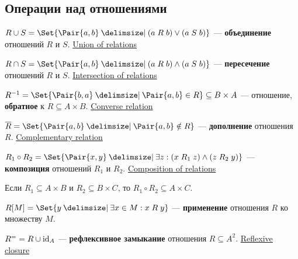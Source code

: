 \documentclass[a4paper,10pt]{article}
\begin{document}
\subsection{Операции над отношениями}

\begin{terms}
    \item $R \union S = \Set{\Pair{a,b} \given (a \rel[R] b) \lor (a \rel[S] b)}$ --- \textbf{объединение} отношений $R$ и $S$.
    \hfill\href{https://en.wikipedia.org/wiki/Binary_relation#Union}{Union of relations}

    \item $R \intersection S = \Set{\Pair{a,b} \given (a \rel[R] b) \land (a \rel[S] b)}$ --- \textbf{пересечение} отношений $R$ и $S$.
    \hfill\href{https://en.wikipedia.org/wiki/Binary_relation#Intersection}{Intersection of relations}

    \item $R^{-1} = \Set{\Pair{b,a} \given \Pair{a,b} \in R} \subseteq B \times A$ --- отношение, \textbf{обратное} к $R \subseteq A \times B$.
    \hfill\href{https://en.wikipedia.org/wiki/Converse_relation}{Converse relation}

    \item $\overline{R} = \Set{\Pair{a,b} \given \Pair{a,b} \notin R}$ --- \textbf{дополнение} отношения $R$.
    \hfill\href{https://en.wikipedia.org/wiki/Complement_(set_theory)\#Complementary_relation}{Complementary relation}

    \item $R_1 \circ R_2 = \Set{\Pair{x,y} \given \exists z : (x \rel[R_1] z) \land (z \rel[R_2] y)}$ --- \textbf{композиция} отношений $R_1$ и $R_2$.
    \hfill\href{https://en.wikipedia.org/wiki/Composition_of_relations}{Composition of relations}
    \begin{terms}
        \item Если $R_1 \subseteq A \times B$ и $R_2 \subseteq B \times C$, то $R_1 \circ R_2 \subseteq A \times C$.
    \end{terms}

    \item $R[M] = \Set{y \given \exists x \in M : x \rel y}$ --- \textbf{применение} отношения $R$ ко множеству $M$.

    \item $R^{=} = R \cup \mathrm{id}_{A}$ --- \textbf{рефлексивное замыкание} отношения $R \subseteq A^2$.
    \hfill\href{https://en.wikipedia.org/wiki/Reflexive_closure}{Reflexive closure}


\end{terms}
\end{document}
